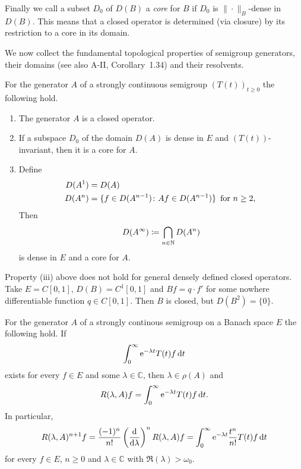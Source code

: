 Finally we call a subset $D_{0}$ of $D(B)$ a \emph{core} for $B$ if $D_{0}$ is $\|\cdot\|_{B}$-dense in $D(B)$.
This means that a closed operator is determined (via closure) by its restriction to a core in its domain.

We now collect the fundamental topological properties of semigroup generators, their domains (see also A-II, Corollary~1.34) and their resolvents.
\begin{proposition}\label{prop:a1-1.9}
For the generator $A$ of a strongly continuous semigroup $(T(t))_{t \geq 0}$ the following hold.
\begin{enumerate}[\upshape(i)]
\item 
The generator $A$ is a closed operator.

\item
If a subspace $D_{0}$ of the domain $D(A)$ is dense in $E$ and $(T(t))$-invariant, then it is a core for $A$.
\item Define 
%
\begin{align*}
	D(A^{1}) &= D(A) \\
	D(A^{n}) &= \{f \in D(A^{n-1}) \colon Af \in D(A^{n-1})\} \, \text{ for $ n \geq 2 $, }
\end{align*}
%
Then %
\[
	D(A^{\infty}) \coloneqq \bigcap_{n \in \mathbb{N}} D(A^{n})
\]
%
is dense in $E$ and a core for $A$.
\end{enumerate}
\end{proposition}
\begin{example}\label{ex:a1-1.10}
Property (iii) above does not hold for general densely defined closed operators.
Take $E = C\left[ 0,1 \right]$, $D(B) = C^{1}\left[ 0,1 \right]$ and $Bf = q \cdot f'$ for some nowhere differentiable function $q \in C\left[ 0,1 \right]$.
Then $B$ is closed, but $D(B^{2}) = \{0\}$.
\end{example}
\begin{proposition}\label{prop:a1-1.11}
For the generator $A$ of a strongly continous semigroup on a Banach space $E$ the following hold.
If %
\[
	 \int_{0}^{\infty}  \mathrm{e}^{-\lambda t}T(t)f \mathop{}\!\mathrm{d}{t} 
\]
%
exists for every $f \in E$ and some $\lambda \in \mathbb{C}$, then $\lambda \in \rho(A)$ and 
%
\[
	R(\lambda,A)f = \int_{0}^{\infty}  \mathrm{e}^{-\lambda t}T(t)f  \mathop{}\!\mathrm{d}{t}.
\]
%
In particular,
\begin{equation}\label{eq:a1-1.7}
R(\lambda,A)^{n+1}f 
	= \frac{(-1)^{n}}{n!}\left(\frac{\mathop{}\!\mathrm{d}{ }}{\mathop{}\!\mathrm{d}{\lambda}}\right)^{n} R(\lambda,A)f 
	= \int_{0}^{\infty}  \mathrm{e}^{-\lambda t}\frac{t^{n}}{n!}T(t)f  \mathop{}\!\mathrm{d}{t}
\end{equation}
for every $f \in E$, $n \geq 0$ and $\lambda \in \mathbb{C}$ with $\Re(\lambda) > \omega_{0}$.
\end{proposition}
